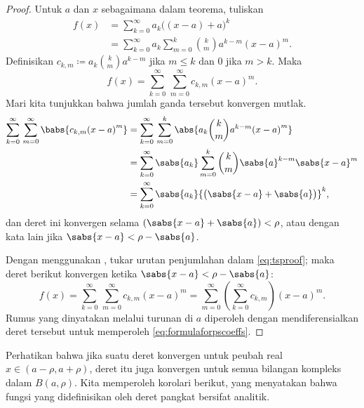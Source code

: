 \begin{proof}
Untuk $a$ dan $x$ sebagaimana dalam teorema,
tuliskan
\begin{equation*}
\begin{split}
f(x) &= \sum_{k=0}^\infty a_k {\bigl((x-a)+a\bigr)}^k \\
&= \sum_{k=0}^\infty a_k \sum_{m=0}^k \binom{k}{m} a^{k-m} {(x-a)}^m .
\end{split}
\end{equation*}
Definisikan $c_{k,m} \coloneqq a_k \binom{k}{m} a^{k-m}$ jika $m \leq k$ dan $0$ jika $m >
k$.  Maka
\begin{equation} \label{eq:tsproof}
f(x) = \sum_{k=0}^\infty \, \sum_{m=0}^\infty c_{k,m} {(x-a)}^m .
\end{equation}
Mari kita tunjukkan bahwa jumlah ganda tersebut konvergen mutlak.
\begin{equation*}
\begin{split}
\sum_{k=0}^\infty \, \sum_{m=0}^\infty \babs{ c_{k,m} {(x-a)}^m}
& = \sum_{k=0}^\infty \, \sum_{m=0}^k \abs{ a_k \binom{k}{m} a^{k-m} {(x-a)}^m }
\\
& = \sum_{k=0}^\infty \sabs{a_k} \sum_{m=0}^k \binom{k}{m} \sabs{a}^{k-m}
{\sabs{x-a}}^m  \\
& = \sum_{k=0}^\infty \sabs{a_k} {\bigl(\sabs{x-a}+\sabs{a}\bigr)}^k ,
\end{split}
\end{equation*}
dan deret ini konvergen selama
$(\sabs{x-a}+\sabs{a}) < \rho$, atau dengan kata lain jika
$\sabs{x-a} < \rho-\sabs{a}$.

Dengan menggunakan ,
tukar urutan penjumlahan dalam \eqref{eq:tsproof}; maka
deret berikut konvergen ketika $\sabs{x-a} < \rho-\sabs{a}$:
\begin{equation*}
f(x) =
\sum_{k=0}^\infty \, \sum_{m=0}^\infty c_{k,m} {(x-a)}^m
=
\sum_{m=0}^\infty
\left( \sum_{k=0}^\infty
c_{k,m} \right) {(x-a)}^m .
\end{equation*}
Rumus yang dinyatakan melalui turunan di $a$ diperoleh dengan
mendiferensialkan deret tersebut untuk memperoleh \eqref{eq:formulaforpscoeffs}.
\end{proof}

Perhatikan bahwa jika suatu deret konvergen untuk peubah real $x \in (a-\rho,a+\rho)$, deret itu juga konvergen
untuk semua bilangan kompleks dalam $B(a,\rho)$.
Kita memperoleh korolari berikut, yang menyatakan bahwa fungsi yang didefinisikan
oleh deret pangkat bersifat analitik.

